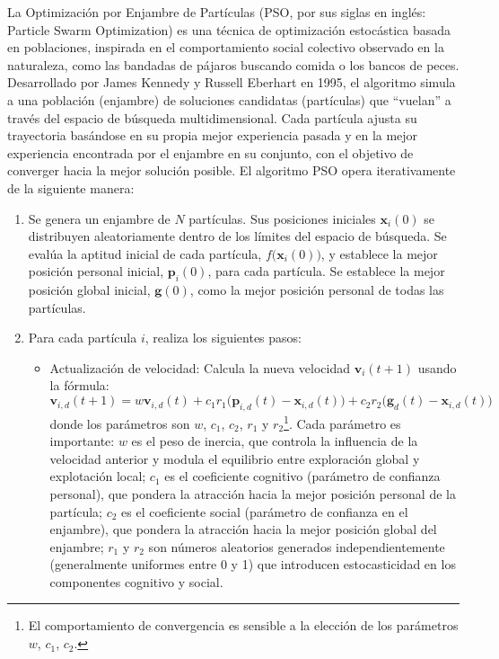 La Optimización por Enjambre de Partículas (PSO, por sus siglas en inglés: Particle Swarm Optimization) es una técnica de optimización estocástica basada en poblaciones, inspirada en el comportamiento social colectivo observado en la naturaleza, como las bandadas de pájaros buscando comida o los bancos de peces. Desarrollado por James Kennedy y Russell Eberhart en 1995, el algoritmo simula a una población (enjambre) de soluciones candidatas (partículas) que “vuelan” a través del espacio de búsqueda multidimensional. Cada partícula ajusta su trayectoria basándose en su propia mejor experiencia pasada y en la mejor experiencia encontrada por el enjambre en su conjunto, con el objetivo de converger hacia la mejor solución posible. El algoritmo PSO opera iterativamente de la siguiente manera:
\begin{enumerate}
    \item {} Se genera un enjambre de $N$ partículas. Sus posiciones iniciales $\mathbf{x}_i(0)$ se distribuyen aleatoriamente dentro de los límites del espacio de búsqueda. Se evalúa la aptitud inicial de cada partícula, $f\big(\mathbf{x}_i(0)\big)$, y establece la mejor posición personal inicial, $\mathbf{p}_i(0)$, para cada partícula. Se establece la mejor posición global inicial, $\mathbf{g}(0)$, como la mejor posición personal de todas las partículas.
    \item {} Para cada partícula $i$, realiza los siguientes pasos:
    \begin{itemize}
        \item Actualización de velocidad: Calcula la nueva velocidad $\mathbf{v}_i(t+1)$ usando la fórmula:
        $$\mathbf{v}_{i,d}(t+1) = w \mathbf{v}_{i,d}(t) + c_1 r_1 \big(\mathbf{p}_{i,d}(t) - \mathbf{x}_{i,d}(t)\big) + c_2 r_2 \big(\mathbf{g}_d(t) - \mathbf{x}_{i,d}(t)\big)$$
        donde los parámetros son $w$, $c_1$, $c_2$, $r_1$ y $r_2$\footnote{El comportamiento de convergencia es sensible a la elección de los parámetros $w$, $c_1$, $c_2$.}. Cada parámetro es importante: $w$ es el peso de inercia, que controla la influencia de la velocidad anterior y modula el equilibrio entre exploración global y explotación local; $c_1$ es el coeficiente cognitivo (parámetro de confianza personal), que pondera la atracción hacia la mejor posición personal de la partícula; $c_2$ es el coeficiente social (parámetro de confianza en el enjambre), que pondera la atracción hacia la mejor posición global del enjambre; $r_1$ y $r_2$ son números aleatorios generados independientemente (generalmente uniformes entre 0 y 1) que introducen estocasticidad en los componentes cognitivo y social.

\end{itemize}
\end{enumerate}
